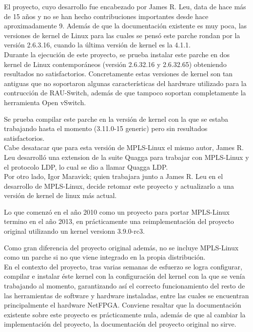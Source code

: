 El proyecto, cuyo desarrollo fue encabezado por James R. Leu, data de hace m\'as de 15 a\~nos y no se han hecho contribuciones importantes desde hace aproximadamente 9. Adem\'as de que la documentaci\'on existente es muy poca, las versiones de kernel de Linux para las cuales se pensó este parche rondan por la versi\'on 2.6.3.16, cuando la \'ultima versi\'on de kernel es la 4.1.1.\\

Durante la ejecuci\'on de este proyecto, se prueba instalar este parche en dos kernel de Linux contemporáneos (versi\'on 2.6.32.16 y 2.6.32.65) obteniendo resultados no satisfactorios. Concretamente estas versiones de kernel son tan antiguas que no soportaron algunas características del hardware utilizado para la contrucci\'on de RAU-Switch, adem\'as de que tampoco soportan completamente la herramienta Open vSwitch.

Se prueba compilar este parche en la versi\'on de kernel con la que se estaba trabajando hasta el momento (3.11.0-15 generic) pero sin resultados satisfactorios.\\

Cabe desatacar que para esta versi\'on de MPLS-Linux el mismo autor, James R. Leu desarroll\'o una extension de la suite Quagga para trabajar con MPLS-Linux y el protocolo LDP, lo cual se dio a llamar Quagga LDP\cite{QuaggaLDP1}.\\  

Por otro lado, Igor Maravick; quien trabajara junto a James R. Leu en el desarrollo de MPLS-Linux, decide retomar este proyecto y actualizarlo a una versi\'on de kernel de linux m\'as actual. 

Lo que comenzó en el a\~no 2010 como un proyecto para portar MPLS-Linux termino en el a\~no 2013, en prácticamente una reimplementaci\'on del proyecto original utilizando un kernel versionn 3.9.0-rc3. 

Como gran diferencia del proyecto original adem\'as, no se incluye MPLS-Linux como un parche si no que viene integrado en la propia distribución.\\

En el contexto del proyecto, tras varias semanas de esfuerzo se logra configurar, compilar e instalar \'este kernel con la configuraci\'on del kernel con la que se ven\'ia trabajando al momento, garantizando as\'i el correcto funcionamiento del resto de las herramientas de software y hardware instaladas, entre las cuales se encuentran principalmente el hardware NetFPGA. Conviene resaltar que la documentaci\'on existente sobre este proyecto es prácticamente nula, adem\'as de que al cambiar la implementaci\'on del proyecto, la documentaci\'on del proyecto original no sirve.\\


